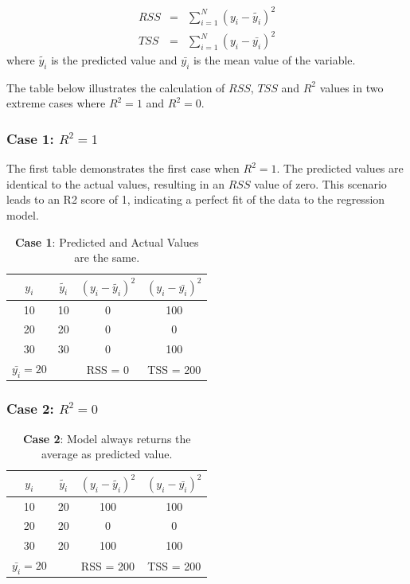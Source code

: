 {\begin{eqnarray}
  RSS &=& \sum_{i=1}^N (y_i-\tilde{y_i})^2 \\
  TSS &=& \sum_{i=1}^N (y_i-\bar{y_i})^2
\end{eqnarray} where $\tilde{y_i}$ is the predicted value and $\bar{y_i}$ is the mean value of the variable. 

The table below illustrates the calculation of $RSS$, $TSS$ and $R^2$ values in two extreme cases where $R^2=1$ and $R^2=0$.

\subsubsection{\textbf{Case 1: $R^2 = 1$}}
The first table demonstrates the first case when $R^2 = 1$. The predicted values are identical to the actual values, resulting in an $RSS$ value of zero. This scenario leads to an R2 score of 1, indicating a perfect fit of the data to the regression model. 

\begin{table}[h]
\centering
\begin{tabular}{|c|c|c|c| }
  \hline
  $y_i$ & $\tilde{y_i}$ & $(y_i-\tilde{y_i})^2$ & $(y_i-\bar{y_i})^2$  \\
  \hline
  10 & 10 & 0 & 100\\
  20 & 20 & 0 & 0\\
  30 & 30 & 0 & 100\\
  \hline
  $\bar{y_i}=20$ &  & RSS = 0  &  TSS = 200\\
  \hline
\end{tabular}
\caption{\textbf{Case 1}: Predicted and Actual Values are the same.}\label{tb:r2Case1}
\end{table}

\subsubsection{\textbf{Case 2: $R^2 = 0$}}
\begin{table}[h]
\centering
\begin{tabular}{|c|c|c|c| }
  \hline
  $y_i$ & $\tilde{y_i}$ & $(y_i-\tilde{y_i})^2$ & $(y_i-\bar{y_i})^2$  \\
  \hline
  10 & 20 & 100 & 100\\
  20 & 20 & 0 & 0\\
  30 & 20 & 100 & 100\\
  \hline
  $\bar{y_i}=20$ &  & RSS = 200  &  TSS = 200\\
  \hline
\end{tabular}
\caption{\textbf{Case 2}: Model always returns the average as predicted value.}\label{tb:r2Case2}
\end{table}

}
